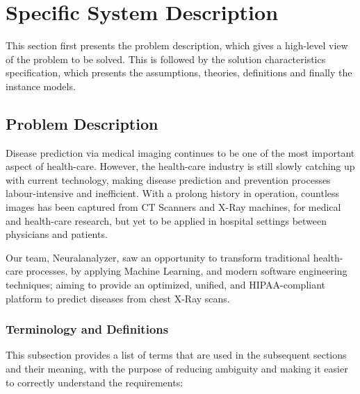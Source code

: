 \documentclass[12pt]{article}
\begin{document}
\section{Specific System Description}
This section first presents the problem description, which gives a high-level
view of the problem to be solved.  This is followed by the solution characteristics
specification, which presents the assumptions, theories, definitions and finally
the instance models.

\subsection{Problem Description}
Disease prediction via medical imaging continues to be one of the most important aspect of health-care. However, the health-care industry is still slowly catching up with current technology, making disease prediction and prevention processes labour-intensive and inefficient. With a prolong history in operation, countless images has been captured from CT Scanners and X-Ray machines, for medical and health-care research, but yet to be applied in hospital settings between physicians and patients.

Our team, Neuralanalyzer, saw an opportunity to transform traditional health-care processes, by applying Machine Learning, and modern software engineering techniques; aiming to provide an optimized, unified, and HIPAA-compliant platform to predict diseases from chest X-Ray scans.
\subsubsection{Terminology and  Definitions}

This subsection provides a list of terms that are used in the subsequent
sections and their meaning, with the purpose of reducing ambiguity and making it
easier to correctly understand the requirements:
\end{document}
